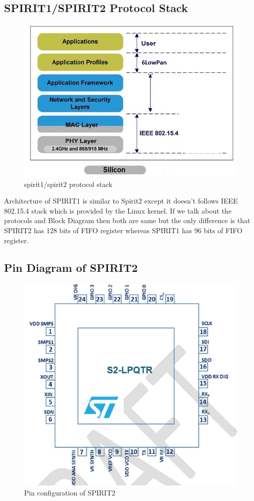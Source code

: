 \subsection{SPIRIT1/SPIRIT2 Protocol Stack}
\begin{figure}[ht]
	\centering
	\includegraphics[scale=0.8]{images/protocol.png}
	\caption{spirit1/spirit2 protocol stack}
\end{figure}
Architecture of SPIRIT1 is similar to Spirit2 except it doesn’t follows IEEE 802.15.4 stack which is provided by the Linux kernel. If we talk about the protocols and Block Diagram then both are same but the only difference is that SPIRIT2 has 128 bits of FIFO register whereas SPIRIT1 has 96 bits of FIFO register.
\subsection{Pin Diagram of SPIRIT2}
\begin{figure}[ht]
	\centering
	\includegraphics[scale=0.8]{images/pindiagram.png}
	\caption{Pin configuration of SPIRIT2}
\end{figure}
